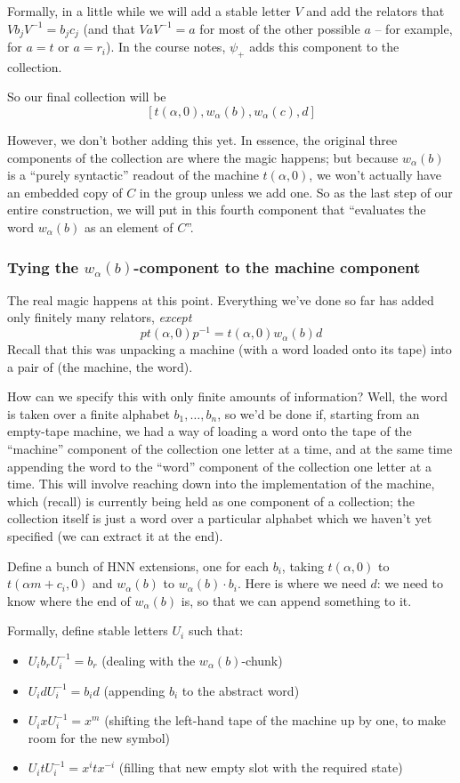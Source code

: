 \documentclass[11pt]{amsart}
\theoremstyle{remark}
\begin{document}
Formally, in a little while we will add a stable letter $V$ and add the relators that $V b_j V^{-1} = b_j c_j$
(and that $V a V^{-1} = a$ for most of the other possible $a$ -- for example, for $a = t$ or $a = r_i$).
In the course notes, $\psi_+$ adds this component to the collection.

So our final collection will be $$[t(\alpha, 0), w_{\alpha}(b), w_{\alpha}(c), d]$$

However, we don't bother adding this yet.
In essence, the original three components of the collection are where the magic happens;
but because $w_{\alpha}(b)$ is a ``purely syntactic'' readout of the machine $t(\alpha, 0)$,
we won't actually have an embedded copy of $C$ in the group unless we add one.
So as the last step of our entire construction, we will put in this fourth component that ``evaluates the word $w_{\alpha}(b)$ as an element of $C$''.

\subsubsection{Tying the $w_{\alpha}(b)$-component to the machine component}

The real magic happens at this point.
Everything we've done so far has added only finitely many relators, \emph{except} $$p t(\alpha, 0) p^{-1} = t(\alpha, 0) w_{\alpha}(b) d$$
Recall that this was unpacking a machine (with a word loaded onto its tape) into a pair of (the machine, the word).

How can we specify this with only finite amounts of information?
Well, the word is taken over a finite alphabet $b_1, \dots, b_n$,
so we'd be done if, starting from an empty-tape machine, we had a way of loading a word onto the tape of the ``machine'' component of the collection one letter at a time, and at the same time appending the word to the ``word'' component of the collection one letter at a time.
This will involve reaching down into the implementation of the machine, which (recall) is currently being held as one component of a collection;
the collection itself is just a word over a particular alphabet which we haven't yet specified (we can extract it at the end).

Define a bunch of HNN extensions, one for each $b_i$, taking $t(\alpha, 0)$ to $t(\alpha m + c_i, 0)$
and $w_{\alpha}(b)$ to $w_{\alpha}(b) \cdot b_i$.
Here is where we need $d$: we need to know where the end of $w_{\alpha}(b)$ is, so that we can append something to it.

Formally, define stable letters $U_i$ such that:
\begin{itemize}
\item $U_i b_r U_i^{-1} = b_r$ (dealing with the $w_{\alpha}(b)$-chunk)
\item $U_i d U_i^{-1} = b_i d$ (appending $b_i$ to the abstract word)
\item $U_i x U_i^{-1} = x^m$ (shifting the left-hand tape of the machine up by one, to make room for the new symbol)
\item $U_i t U_i^{-1} = x^i t x^{-i}$ (filling that new empty slot with the required state)
\end{itemize}
\end{document}
